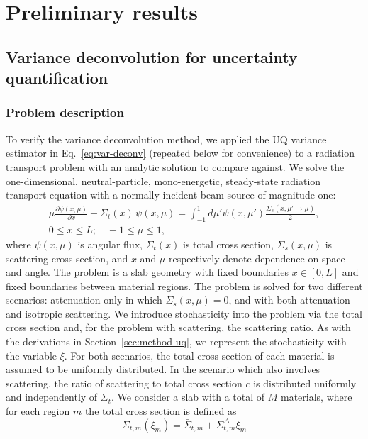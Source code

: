 \chapter{Preliminary results} \label{ch-results}

\section{Variance deconvolution for uncertainty quantification}\label{sec:results-uq}
\subsection{Problem description}
To verify the variance deconvolution method, we applied the UQ variance estimator in Eq.~\eqref{eq:var-deconv} (repeated below for convenience) to a radiation transport problem with an analytic solution to compare against. We solve the one-dimensional, neutral-particle, mono-energetic, steady-state radiation transport equation with a normally incident beam source of magnitude one:
\begin{gather}
	\label{eq:transport}
 	\mu \frac{\partial \psi(x,\mu)}{\partial x} + \Sigma_t(x) \, \psi(x,\mu) =  \int_{-1}^{1} d\mu' \psi(x,\mu') \frac{\Sigma_s(x,\mu' \rightarrow \mu)}{2} , \\
	0 \leq x \leq L; \quad -1 \leq \mu \leq 1, 
\end{gather}
\noindent where $\psi(x, \mu)$ is angular flux, $\Sigma_t(x)$ is total cross section, $\Sigma_s(x,\mu)$ is scattering cross section, and $x$ and $\mu$ respectively denote dependence on space and angle. The problem is a slab geometry with fixed boundaries $x \in [0,L]$ and fixed boundaries between material regions. The problem is solved for two different scenarios: attenuation-only in which $\Sigma_s(x,\mu) = 0$, and with both attenuation and isotropic scattering. 
We introduce stochasticity into the problem via the total cross section and, for the problem with scattering, the scattering ratio. As with the derivations in Section~\ref{sec:method-uq}, we represent the stochasticity with the variable $\xi$. For both scenarios, the total cross section of each material is assumed to be uniformly distributed. In the scenario which also involves scattering, the ratio of scattering to total cross section $c$ is distributed uniformly and independently of $\Sigma_t$. We consider a slab with a total of $M$ materials, where for each region $m$ the total cross section is defined as  
\begin{equation}
	\Sigma_{t,m}(\xi_m) = \bar{\Sigma}_{t,m} + \Sigma_{t,m}^{\Delta}\xi_m
\end{equation}
